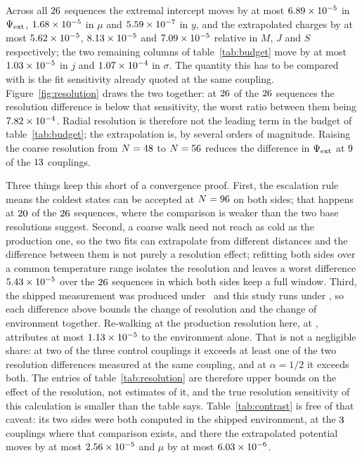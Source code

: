 \documentclass[11pt,a4paper]{article}
\begin{document}
Across all $26$ sequences the extremal intercept moves by at most
$6.89\times 10^{-5}$ in $\Psi_{\mathrm{ext}}$, $1.68\times 10^{-5}$ in $\mu$ and
$5.59\times 10^{-7}$ in $y$, and the
extrapolated charges by at most $5.62\times 10^{-5}$, $8.13\times 10^{-5}$ and
$7.09\times 10^{-5}$ relative in $M$, $J$ and $S$ respectively; the two
remaining columns of table~\ref{tab:budget} move by at most $1.03\times 10^{-5}$
in $j$ and $1.07\times 10^{-4}$ in $\sigma$. The quantity
this has to be compared with is the fit sensitivity already quoted at the same
coupling. Figure~\ref{fig:resolution} draws the two together: at
$26$ of the $26$ sequences the resolution difference is
below that sensitivity, the worst ratio between them being $7.82\times 10^{-4}$.
Radial resolution is therefore not the leading term in the budget of
table~\ref{tab:budget}; the extrapolation is, by several orders of magnitude.
Raising the coarse resolution from $N=48$ to
$N=56$ reduces the difference in $\Psi_{\mathrm{ext}}$ at
$9$ of the $13$ couplings.

Three things keep this short of a convergence proof. First, the escalation rule
means the
coldest states can be accepted at $N=96$ on both sides; that
happens at $20$ of the $26$ sequences, where the
comparison is weaker than the two base resolutions suggest. Second, a coarse
walk need not reach as cold as the production one, so the two fits can
extrapolate from different distances and the difference between them is not
purely a resolution effect; refitting both sides over a common temperature range
isolates the resolution and leaves a worst difference $5.43\times 10^{-5}$ over
the $26$ sequences in which both sides keep a full window.
Third, the shipped measurement was produced under \Nstudyshipped\ and this study
runs under \Nstudyhere, so each difference above bounds the change of resolution
and the change of environment together. Re-walking at the production resolution
here, at \Nstudycontrollist, attributes at most $1.13\times 10^{-5}$ to the
environment alone. That is not a negligible share: at two of the three control
couplings it exceeds at least one of the two resolution differences measured at
the same coupling, and at $\alpha=1/2$ it exceeds both. The entries of
table~\ref{tab:resolution} are therefore upper bounds on the effect of the
resolution, not estimates of it, and the true resolution sensitivity of this
calculation is smaller than the table says. Table~\ref{tab:contrast} is free of that caveat: its two sides
were both computed in the shipped environment, at the $3$
couplings where that comparison exists, and there the extrapolated potential
moves by at most $2.56\times 10^{-5}$ and $\mu$ by at most $6.03\times 10^{-6}$.
\end{document}
